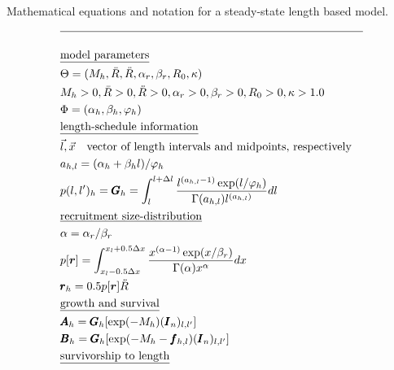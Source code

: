 \documentclass[12pt,letterpaper]{article}
\newcounter{saveEq}
\def\putEq{\setcounter{saveEq}{\value{equation}}}
\def\tableEq{ %
    \putEq \setcounter{equation}{0}
    \renewcommand{\theequation}{T\arabic{table}.\arabic{equation}}
    \vspace{-5mm}
    }
\begin{document}
\begin{table}
  \centering
\caption{Mathematical equations and notation for a steady-state length based model.}
\label{tab:equilibrium_model}
\tableEq
  \begin{align}
    \hline \nonumber \\
    &\mbox{\underline{model parameters}} \nonumber\\
    &\Theta = (M_h,\bar{R},\ddot{R},\alpha_r,\beta_r,R_0,\kappa) \label{T1.1}\\
    &M_h > 0 , \bar{R} > 0, \ddot{R}>0, \alpha_r > 0, \beta_r > 0, R_0>0,\kappa > 1.0 \label{T1.2}\\
    &\Phi = (\alpha_h,\beta_h,\varphi_h) \label{T1.3}\\
    &\mbox{\underline{length-schedule information}} \nonumber \\
    &\vec{l},\vec{x} \quad \mbox{vector of length intervals and midpoints, respectively} \nonumber\\
    &a_{h,l} = (\alpha_h + \beta_h l)/\varphi_h \label{T1.4} \\
    &p({l},{l'})_h =\pmb{G}_h= \int_{l}^{l+\Delta l}
        \frac{ l^{(a_{h,l}-1)} \exp(l/\varphi_h) }
        { \Gamma(a_{h,l}) l^{(a_{h,l})} } dl \label{T1.5} \\
    &\mbox{\underline{recruitment size-distribution}} \nonumber \\
    & \alpha = \alpha_r / \beta_r  \\
    &p[\bm{r}] = \int_{x_l-0.5\Delta x}^{x_l+0.5\Delta x}
      \frac{x^{(\alpha-1)}\exp(x / \beta_r)}{\Gamma(\alpha)x^\alpha}dx
        \label{T1.7}\\
    &\pmb{r}_h = 0.5 p[\bm{r}] \ddot{R} \label{T1.8}\\
    &\mbox{\underline{growth and survival}} \nonumber \\
    &\pmb{A}_h = \pmb{G}_h [\exp(-M_h) (\pmb{I}_n)_{l,l'}]\label{T1.10}\\
    &\pmb{B}_h = \pmb{G}_h [\exp(-M_h - \pmb{f}_{h,l}) (\pmb{I}_n)_{l,l'}] \label{T1.12}\\
    &\mbox{\underline{survivorship to length}} \nonumber \\

\end{align}
\end{table}
\end{document}
